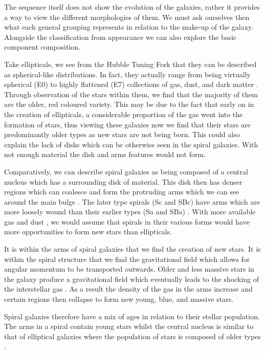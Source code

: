 \documentclass[12pt, onecolumn]{revtex4}    %
\begin{document}
The sequence itself does not show the evolution of the galaxies, rather it provides a way to view the different morphologies of them. We must ask ourselves then what each general grouping represents in relation to the make-up of the galaxy. Alongside the classification from appearance we can also explore the basic component composition.

Take ellipticals, we see from the Hubble Tuning Fork that they can be described as spherical-like distributions. In fact, they actually range from being virtually spherical (E0) to highly flattened (E7) collections of gas, dust, and dark matter \cite{moore_databook}. Through observation of the stars within them, we find that the majority of them are the older, red coloured variety. This may be due to the fact that early on in the creation of ellipticals, a considerable proportion of the gas went into the formation of stars, thus viewing these galaxies now we find that their stars are predominantly older types \cite{carroll_astro} as new stars are not being born. This could also explain the lack of disks which can be otherwise seen in the spiral galaxies. With not enough material the disk and arms features would not form.

Comparatively, we can describe spiral galaxies as being composed of a central nucleus which has a surrounding disk of material. This disk then has denser regions which can coalesce and form the protruding arms which we can see around the main bulge \cite{carroll_astro}. The later type spirals (Sc and SBc) have arms which are more loosely wound than their earlier types (Sa and SBa) \cite{moore_databook}. With more available gas and dust \cite{carroll_astro}, we would assume that spirals in their various forms would have more opportunities to form new stars than ellipticals. 

It is within the arms of spiral galaxies that we find the creation of new stars. It is within the spiral structure that we find the gravitational field which allows for angular momentum to be transported outwards. Older and less massive stars in the galaxy produce a gravitational field which eventually leads to the shocking of the interstellar gas \cite{binney_galaxies}. As a result the density of the gas in the arms increase and certain regions then collapse to form new young, blue, and massive stars. 

Spiral galaxies therefore have a mix of ages in relation to their stellar population. The arms in a spiral contain young stars whilst the central nucleus is similar to that of elliptical galaxies where the population of stars is composed of older types \cite{carroll_astro, binney_galaxies}.
\end{document}
